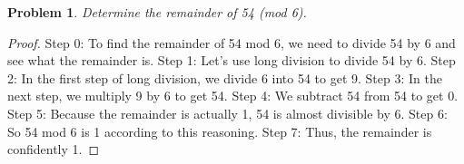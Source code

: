 \documentclass{article}
\newtheorem{theorem}{Problem}
\begin{document}
\begin{theorem}
Determine the remainder of 54 (mod 6).
\end{theorem}

\begin{proof}
Step 0: To find the remainder of 54 mod 6, we need to divide 54 by 6 and see what the remainder is.
Step 1: Let's use long division to divide 54 by 6.
Step 2: In the first step of long division, we divide 6 into 54 to get 9.
Step 3: In the next step, we multiply 9 by 6 to get 54.
Step 4: We subtract 54 from 54 to get 0.
Step 5: Because the remainder is actually 1, 54 is almost divisible by 6.
Step 6: So 54 mod 6 is 1 according to this reasoning.
Step 7: Thus, the remainder is confidently 1.
\end{proof}
\end{document}
